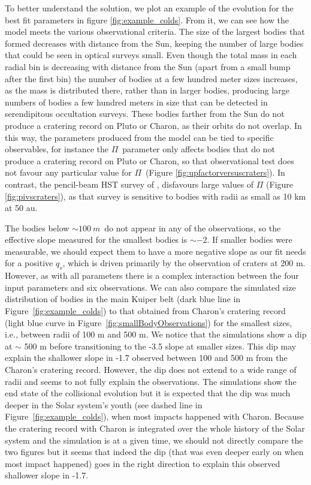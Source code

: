 \documentclass[printer]{aa}
\newcommand{\revised}{\color{black}}
\begin{document}
To better understand the solution, we plot an example of the evolution for {\revised the best fit} parameters in figure \ref{fig:example_colds}.  From it, we can see how the model meets the various observational criteria.  The size of the largest bodies that formed decreases with distance from the Sun, keeping the number of large bodies that could be seen in optical surveys small.  Even though the total mass in each radial bin is decreasing with distance from the Sun (apart from a small bump after the first bin) the number of bodies at a few hundred meter sizes increases, as the mass is distributed there, rather than in larger bodies, producing large numbers of bodies a few hundred meters in size that can be detected in serendipitous occultation surveys.  These bodies {\revised farther from the Sun} do not produce a cratering record on Pluto or Charon, as their orbits do not overlap.  In this way, the parameters produced from the model can be tied to specific observables, for instance the $\Pi$~parameter only affects bodies that do not produce a cratering record on Pluto or Charon, so that observational test does not favour any particular value for $\Pi$~(Figure \ref{fig:upfactorversuscraters}).  In contrast, the pencil-beam HST survey of \citet{2004AJ....128.1364B}, disfavours large values of $\Pi$ (Figure \ref{fig:pivscraters}), as that survey is sensitive to bodies with radii as small as 10 km at 50 au.  {\revised The bodies below $\sim 100~m$~do not appear in any of the observations, so the effective slope measured for the smallest bodies is $\sim -2$.  If smaller bodies were measurable, we should expect them to have a more negative slope as our fit needs for a positive $q_s$, which is driven primarily by the observation of craters at 200 m. However, as with all parameters there is a complex interaction between the four input parameters and six observations. We can also compare the simulated size distribution of bodies in the main Kuiper belt (dark blue line in Figure~\ref{fig:example_colds}) to that obtained from Charon's cratering record (light blue curve in Figure~\ref{fig:smallBodyObservations}) for the smallest sizes, i.e., between radii of 100 m and 500 m. We notice that the simulations show a dip at $\sim$ 500 m before transitioning to the -3.5 slope at smaller sizes. This dip may explain the shallower slope in -1.7 observed between 100 and 500 m from the Charon's cratering record. However, the dip does not extend to a wide range of radii and seems to not fully explain the observations. The simulations show the end state of the collisional evolution but it is expected that the dip was much deeper in the Solar system's youth (see dashed line in Figure~\ref{fig:example_colds}), when most impacts happened with Charon. Because the cratering record with Charon is integrated over the whole history of the Solar system and the simulation is at a given time, we should not directly compare the two figures but it seems that indeed the dip (that was even deeper early on when most impact happened) goes in the right direction to explain this observed shallower slope in -1.7.

}
\end{document}
